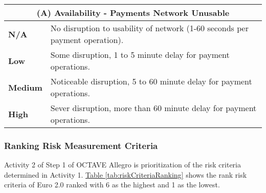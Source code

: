 \documentclass[12pt]{article} %
\newcommand{\hypertableref}[1]{\hyperref[#1]{Table \ref{#1}}}
\begin{document}
{\begin{center}
\begin{tabular}{ | l | p{12cm} | }
  \hline
  \multicolumn{2}{|c|}{\textbf{(A) Availability - Payments Network Unusable}}
  \\ \hline
  \textbf{N/A} & No disruption to usability of network (1-60 seconds per payment operation).
  \\ \hline
  \textbf{Low} & Some disruption, 1 to 5 minute delay for payment operations.
  \\ \hline
  \textbf{Medium} & Noticeable disruption, 5 to 60 minute delay for payment operations.
  \\ \hline
  \textbf{High} & Sever disruption, more than 60 minute delay for payment operations.
  \\ \hline
\end{tabular}
\end{center}
\label{tab:availabilityRiskCriteria}


\subsubsection{Ranking Risk Measurement Criteria} \label{sssec:5.1:ranking}

Activity 2 of Step 1 of OCTAVE Allegro is prioritization of the risk criteria determined in Activity 1. \hypertableref{tab:riskCriteriaRanking} shows the rank risk criteria of Euro 2.0 ranked with 6 as the highest and 1 as the lowest.

\begin{center}
\end{center}
\label{tab:riskCriteriaRanking}

}
\end{document}
